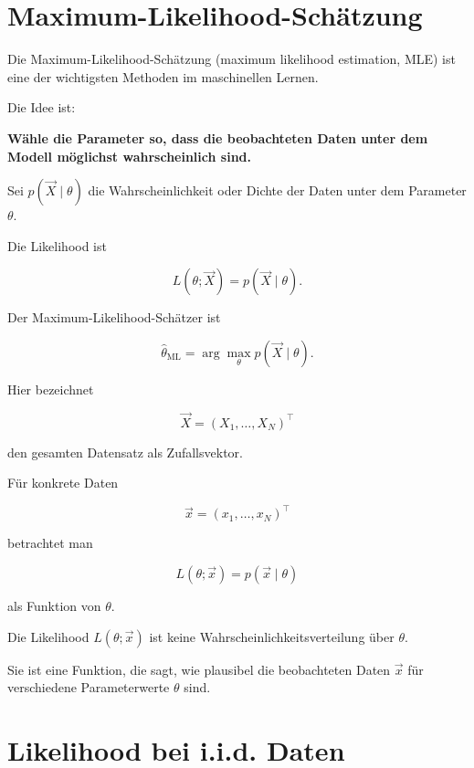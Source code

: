 \section{Maximum-Likelihood-Schätzung}

Die Maximum-Likelihood-Schätzung (maximum likelihood estimation, MLE) ist eine der wichtigsten Methoden im maschinellen Lernen.

Die Idee ist:

\begin{center}
\textbf{Wähle die Parameter so, dass die beobachteten Daten unter dem Modell möglichst wahrscheinlich sind.}
\end{center}

\begin{definitionbox}
Sei \(p(\vec{X} \mid \theta)\) die Wahrscheinlichkeit oder Dichte der Daten unter dem Parameter \(\theta\).

Die Likelihood ist

\[
    L(\theta;\vec{X})
    =
    p(\vec{X} \mid \theta).
\]

Der Maximum-Likelihood-Schätzer ist

\[
    \hat{\theta}_{\mathrm{ML}}
    =
    \arg\max_{\theta}
    p(\vec{X} \mid \theta).
\]
\end{definitionbox}

Hier bezeichnet

\[
    \vec{X}
    =
    (X_1,\dots,X_N)^\top
\]

den gesamten Datensatz als Zufallsvektor.

Für konkrete Daten

\[
    \vec{x}
    =
    (x_1,\dots,x_N)^\top
\]

betrachtet man

\[
    L(\theta;\vec{x})
    =
    p(\vec{x} \mid \theta)
\]

als Funktion von \(\theta\).

\begin{notebox}
Die Likelihood \(L(\theta;\vec{x})\) ist keine Wahrscheinlichkeitsverteilung über \(\theta\).

Sie ist eine Funktion, die sagt, wie plausibel die beobachteten Daten \(\vec{x}\) für verschiedene Parameterwerte \(\theta\) sind.
\end{notebox}

\section{Likelihood bei i.i.d. Daten}

